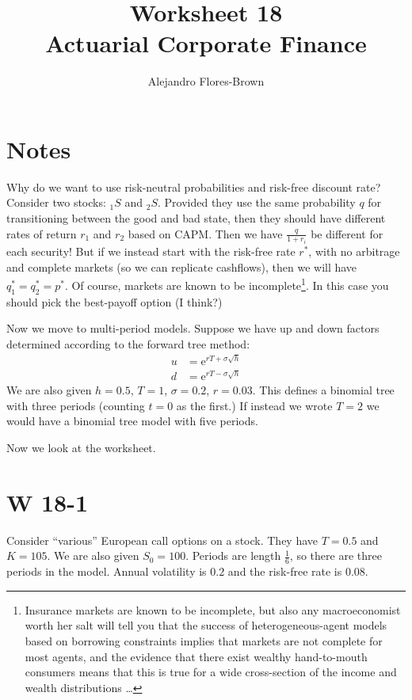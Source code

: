 \documentclass[12pt, letterpaper]{article}
\title{Worksheet 18 \\ Actuarial Corporate Finance}
\author{Alejandro Flores-Brown}
\newcommand{\e}{\mathrm{e}}
\begin{document}
    \maketitle

    \section{Notes}

    Why do we want to use risk-neutral probabilities and risk-free discount rate? Consider two stocks: \({}_{1}S\) and \({}_{2}S\). Provided they use the same probability \(q\) for transitioning between the good and bad state, then they should have different rates of return \(r_1\) and \(r_2\) based on CAPM. Then we have \(\frac{q}{1 + r_i}\) be different for each security! But if we instead start with the risk-free rate \(r^*\), with no arbitrage and complete markets (so we can replicate cashflows), then we will have \(q_1^* = q_2^* = p^*\). Of course, markets are known to be incomplete\footnote{Insurance markets are known to be incomplete, but also any macroeconomist worth her salt will tell you that the success of heterogeneous-agent models based on borrowing constraints implies that markets are not complete for most agents, and the evidence that there exist wealthy hand-to-mouth consumers means that this is true for a wide cross-section of the income and wealth distributions \dots}. In this case you should pick the best-payoff option (I think?)

    Now we move to multi-period models. Suppose we have up and down factors determined according to the forward tree method:
    \begin{align*}
    u &= \e^{rT + \sigma \sqrt{h}} \\
    d &= \e^{rT - \sigma \sqrt{h}}
    \end{align*}
    We are also given \(h = 0.5\), \(T = 1\), \(\sigma = 0.2\), \(r = 0.03\). This defines a binomial tree with three periods (counting \(t = 0\) as the first.) If instead we wrote \(T = 2\) we would have a binomial tree model with five periods.

    Now we look at the worksheet.

    \section{W 18-1}

    Consider ``various'' European call options on a stock. They have \(T = 0.5\) and \(K = 105\). We are also given \(S_0 = 100\). Periods are length \(\frac{1}{6}\), so there are three periods in the model. Annual volatility is \(0.2\) and the risk-free rate is \(0.08\).
\end{document}
